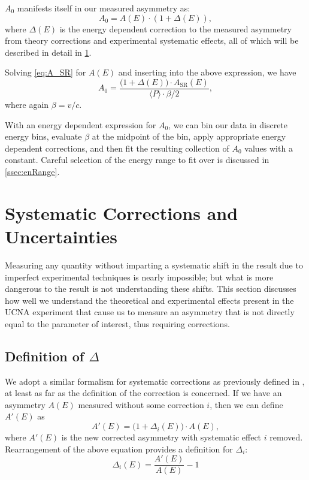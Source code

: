 $A_0$ manifests itself in our measured asymmetry as:
%
\begin{equation}
A_0 = A(E) \cdot \left( 1 + \Delta(E) \right),
\end{equation}
%
\noindent where $\Delta(E)$ is the energy dependent correction to the measured asymmetry
from theory corrections and experimental systematic effects, all of which will be
described in detail in \ref{sec:systematics}.

Solving \ref{eq:A_SR} for $A(E)$ and inserting into the above expression, we have 
%
\begin{equation}
  A_0 = \frac{\big( 1 + \Delta(E) \big) \cdot A_{\mathrm{SR}}(E) }
  {\langle P \rangle \cdot \beta/2},
  \label{eq:A0}
\end{equation}
%
\noindent where again $\beta=v/c$. 

With an energy dependent expression for $A_0$, we can bin our data in discrete
energy bins, evaluate $\beta$ at the midpoint of the bin, apply appropriate energy
dependent corrections, and then fit the resulting collection of $A_0$ values with a
constant. Careful selection of the energy range to fit over is discussed
in \ref{ssec:enRange}. 


\section{Systematic Corrections and Uncertainties} \label{sec:systematics}

Measuring any quantity without imparting a systematic shift in the result due to
imperfect experimental techniques is nearly impossible; but what is more dangerous
to the result is not understanding these shifts. This section discusses how well
we understand the theoretical and experimental effects present in the UCNA
experiment that cause us to measure an asymmetry that is not directly equal to
the parameter of interest, thus requiring corrections.

\subsection{Definition of $\Delta$}

We adopt a similar formalism for systematic corrections as previously defined in
\cite{mpmThesis}, at least as far as the definition of the correction is concerned.
If we have an asymmetry $A(E)$ measured without some correction $i$,
then we can define $A'(E)$ as
%
\begin{equation} \label{eq:aprimedelta}
  A'(E) = \big( 1 + \Delta_i(E) \big) \cdot A(E),
\end{equation}
%
\noindent where $A'(E)$ is the new corrected asymmetry with systematic effect $i$ removed.
Rearrangement of the above equation provides a definition for $\Delta_i$:
%
\begin{equation} \label{eq:delta}
  \Delta_i(E) = \frac{A'(E)}{A(E)} - 1
\end{equation}

